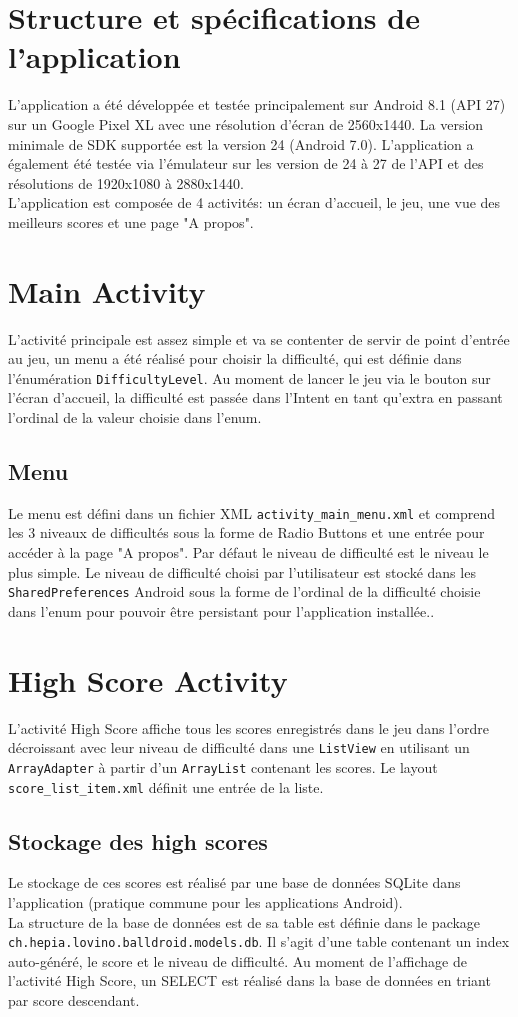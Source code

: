 \documentclass{article}
\begin{document}
\section{Structure et spécifications de l'application}
L'application a été développée et testée principalement sur Android 8.1 (API 27) sur un Google Pixel XL avec une résolution d'écran de 2560x1440. La version minimale de SDK supportée est la version 24 (Android 7.0). L'application a également été testée via l'émulateur sur les version de 24 à 27 de l'API et des résolutions de 1920x1080 à 2880x1440.\\

L'application est composée de 4 activités: un écran d'accueil, le jeu, une vue des meilleurs scores et une page "A propos".
\section{Main Activity}
L'activité principale est assez simple et va se contenter de servir de point d'entrée au jeu, un menu a été réalisé pour choisir la difficulté, qui est définie dans l'énumération \verb+DifficultyLevel+. Au moment de lancer le jeu via le bouton sur l'écran d'accueil, la difficulté est passée dans l'Intent en tant qu'extra en passant l'ordinal de la valeur choisie dans l'enum.
\subsection{Menu}
Le menu est défini dans un fichier XML \verb+activity_main_menu.xml+ et comprend les 3 niveaux de difficultés sous la forme de Radio Buttons et une entrée pour accéder à la page "A propos". Par défaut le niveau de difficulté est le niveau le plus simple. Le niveau de difficulté choisi par l'utilisateur est stocké dans les \verb+SharedPreferences+ Android sous la forme de l'ordinal de la difficulté choisie dans l'enum pour pouvoir être persistant pour l'application installée.. 
\section{High Score Activity}
L'activité High Score affiche tous les scores enregistrés dans le jeu dans l'ordre décroissant avec leur niveau de difficulté dans une \verb+ListView+ en utilisant un \verb+ArrayAdapter+ à partir d'un \verb+ArrayList+ contenant les scores. Le layout \verb+score_list_item.xml+ définit une entrée de la liste.
\subsection{Stockage des high scores}
 Le stockage de ces scores est réalisé par une base de données SQLite dans l'application (pratique commune pour les applications Android).\\
 La structure de la base de données est de sa table est définie dans le package \verb+ch.hepia.lovino.balldroid.models.db+. Il s'agit d'une table contenant un index auto-généré, le score et le niveau de difficulté. Au moment de l'affichage de l'activité High Score, un SELECT est réalisé dans la base de données en triant par score descendant.
\end{document}
